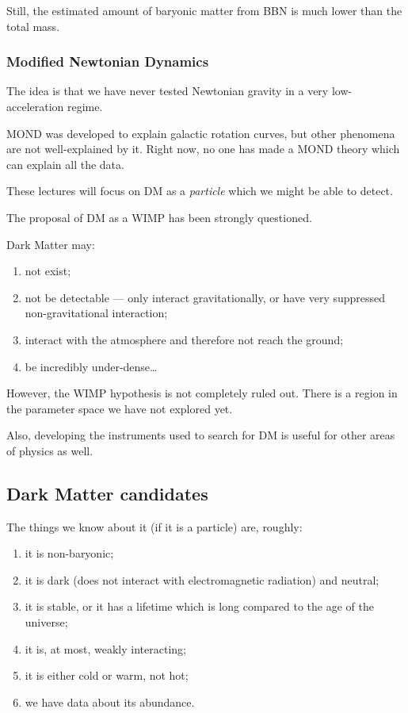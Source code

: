 \documentclass[main.tex]{subfiles}
\begin{document}
Still, the estimated amount of baryonic matter from BBN is much lower 
than the total mass. 

\subsubsection{Modified Newtonian Dynamics}

The idea is that we have never tested Newtonian gravity in a very low-acceleration 
regime. 

MOND was developed to explain galactic rotation curves, but other 
phenomena are not well-explained by it. 
Right now, no one has made a MOND theory which can explain all the data. 

These lectures will focus on DM as a \emph{particle} which we might be able 
to detect. 

The proposal of DM as a WIMP has been strongly questioned. 

Dark Matter may:
\begin{enumerate}
    \item not exist;
    \item not be detectable --- only interact gravitationally, or have very suppressed non-gravitational interaction;
    \item interact with the atmosphere and therefore not reach the ground;
    \item be incredibly under-dense\dots
\end{enumerate}

However, the WIMP hypothesis is not completely ruled out.
There is a region in the parameter space we have not explored yet. 

Also, developing the instruments used to search for DM is useful for other areas of 
physics as well. 

\subsection{Dark Matter candidates}

The things we know about it (if it is a particle) are, roughly: 
\begin{enumerate}
    \item it is non-baryonic;
    \item it is dark (does not interact with electromagnetic radiation) and neutral;
    \item it is stable, or it has a lifetime which is long compared to the age of the universe;
    \item it is, at most, weakly interacting;
    \item it is either cold or warm, not hot;
    \item we have data about its abundance. 
\end{enumerate}
\end{document}
